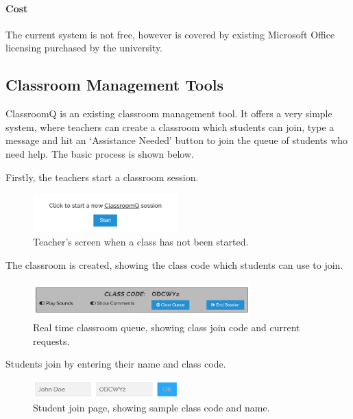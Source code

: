 \documentclass[a4paper,11pt]{article}
\begin{document}
\paragraph{Cost}  
The current system is not free, however is covered by existing Microsoft Office licensing purchased by the university.  


\newpage
\subsection{Classroom Management Tools}

ClassroomQ is an existing classroom management tool. It offers a very simple system, where teachers can create a classroom which students can join, type a message and hit an `Assistance Needed' button to join the queue of students who need help. The basic process is shown below.

Firstly, the teachers start a classroom session.

\FloatBarrier
\begin{figure}[H]
  \centering
  \includegraphics[width=0.5\textwidth]{cq1.png}
  \caption{Teacher's screen when a class has not been started.}
\end{figure}

The classroom is created, showing the class code which students can use to join.

\FloatBarrier
\begin{figure}[H]
  \centering
  \includegraphics[width=0.75\textwidth]{cq2.png}
  \caption{Real time classroom queue, showing class join code and current requests.}
\end{figure}

Students join by entering their name and class code.

\FloatBarrier
\begin{figure}[H]
  \centering
  \includegraphics[width=0.5\textwidth]{cq3.png}
  \caption{Student join page, showing sample class code and name.}
\end{figure}
\end{document}
